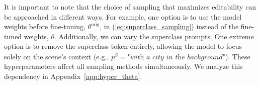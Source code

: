 It is important to note that the choice of sampling that maximizes editability can be approached in different ways. For example, one option is to use the model weights before fine-tuning, $\theta^{\text{orig}}$, in (\ref{eq:superclass_sampling}) instead of the fine-tuned weights, $\theta$. Additionally, we can vary the superclass prompts. One extreme option is to remove the superclass token entirely, allowing the model to focus solely on the scene's context (e.g., $p^{\hat{S}} = \textit{"with a city in the background"}$). These hyperparameters affect all sampling methods simultaneously. We analyze this dependency in Appendix~\ref{app:hyper_theta}.